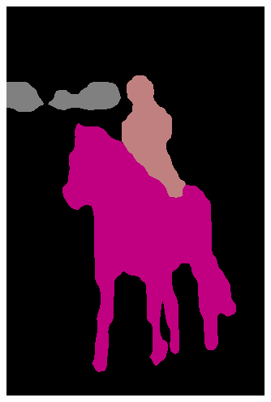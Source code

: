 \documentclass{article} %
\begin{document}
\begin{figure}[t]
\begin{subfigure}[b]{0.19\linewidth}
    \includegraphics[width=\textwidth]{figs/ab/step8_voc/2007_005331}
  \end{subfigure}
  \begin{subfigure}[b]{0.19\linewidth}

\end{subfigure}
\end{figure}
\end{document}
